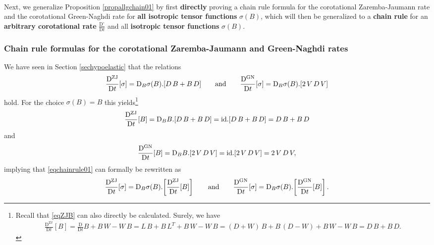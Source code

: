 \documentclass[10pt]{article}
\numberwithin{theoremCounter}{section}
\theoremstyle{plain}
\theoremstyle{definition}
\newcommand{\red}[1]{{\color{red}#1}}
\newcommand{\DD}{\mathrm{D}}
\DeclareMathOperator{\Sym}{Sym}
\DeclareMathOperator{\ZJ}{ZJ}
\DeclareMathOperator{\GN}{GN}
\numberwithin{equation}{section}
\begin{document}
\\
Next, we generalize Proposition \ref{propallgchain01} by first \textbf{directly} proving a chain rule formula for the corotational Zaremba-Jaumann rate and the corotational Green-Naghdi rate for \textbf{all isotropic tensor functions} $\sigma(B)$, which will then be generalized to a \textbf{chain rule} for an \textbf{arbitrary corotational rate} $\frac{\DD^{\circ}}{\DD t}$ and all \textbf{isotropic tensor functions} $\sigma(B)$. 
%
\subsubsection{Chain rule formulas for the corotational Zaremba-Jaumann and Green-Naghdi rates}
%
We have seen in Section \ref{sechypoelastic} that the relations
	\begin{align}
	\label{eqchainrule01}
	\frac{\DD^{\ZJ}}{\DD t}[\sigma] = \DD_B \sigma(B).[D \, B + B \, D] \qquad \textnormal{and} \qquad \frac{\DD^{\GN}}{\DD t}[\sigma] = \DD_B \sigma(B).[2 \, V \, D \, V]
	\end{align}
hold. For the choice $\sigma(B) = B$ this yields\footnote
{
Recall that \eqref{eqZJB} can also directly be calculated. Surely, we have
	\begin{align*}
	\frac{\DD^{\ZJ}}{\DD t}[B] = \frac{\DD}{\DD t} B + B \, W - W \, B = L \, B + B \, L^T + B \, W - W \, B = (D + W) \, B + B \, (D - W) + B \, W - W \, B = D \, B + B \, D.
	\end{align*}
}
	\begin{align}
	\label{eqZJB}
	\frac{\DD^{\ZJ}}{\DD t}[B] = \DD_B B.[D \, B + B \, D] = \textnormal{id}.[D \, B + B \, D] = D \, B + B \, D
	\end{align}
and
	\begin{align}
	\frac{\DD^{\GN}}{\DD t}[B] = \DD_B B.[2 \, V \, D \, V] = \textnormal{id}.[2 \, V \, D \, V] = 2 \, V \, D \, V,
	\end{align}
implying that \eqref{eqchainrule01} can formally be rewritten as
	\begin{align}
	\frac{\DD^{\ZJ}}{\DD t}[\sigma] = \DD_B \sigma(B).\!\left[\frac{\DD^{\ZJ}}{\DD t}[B]\right] \qquad \textnormal{and} \qquad \frac{\DD^{\GN}}{\DD t}[\sigma] = \DD_B \sigma(B).\!\left[\frac{\DD^{\GN}}{\DD t}[B]\right].
	\end{align}
\end{document}
